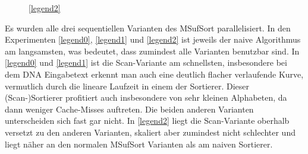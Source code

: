 \begin{figure}[ht]

    \medskip
    \ref{legend2}
\end{figure}
\FloatBarrier

Es wurden alle drei sequentiellen Varianten des MSufSort parallelisiert.
In  den Experimenten \ref{legend0}, \ref{legend1} und \ref{legend2} ist jeweils der naive Algorithmus am langsamsten, was bedeutet,
dass zumindest alle Varianten benutzbar sind. In \ref{legend0} und \ref{legend1} ist die Scan-Variante am schnellsten,
insbesondere bei dem DNA Eingabetext erkennt man auch eine deutlich flacher verlaufende Kurve,
vermutlich durch die lineare Laufzeit in einem der Sortierer.
Dieser (Scan-)Sortierer profitiert auch insbesondere von sehr kleinen Alphabeten,
da dann weniger Cache-Misses auftreten. Die beiden anderen Varianten unterscheiden sich fast gar nicht.
In \ref{legend2} liegt die Scan-Variante oberhalb versetzt zu den anderen Varianten,
skaliert aber zumindest nicht schlechter und liegt näher an den normalen MSufSort Varianten als am naiven Sortierer.